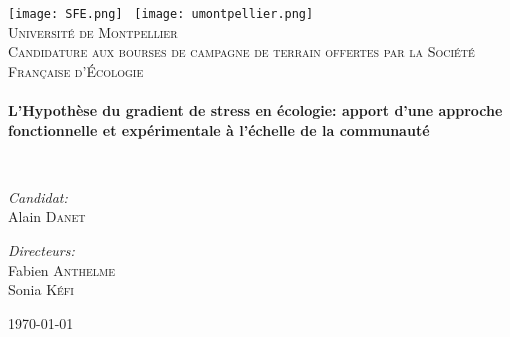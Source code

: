 \begin{titlepage}
\begin{center}

\texttt{[image: SFE.png]}~ \hfill \texttt{[image: umontpellier.png]}~\\[1cm]

\textsc{\LARGE Université de Montpellier}\\[1.5cm]

\textsc{\large Candidature aux bourses de campagne de terrain offertes par la 
Société Française d'Écologie}\\[0.5cm]

\HRule \\[0.4cm]
{ \Large \bfseries  L'Hypothèse du gradient de stress en écologie: apport d'une approche fonctionnelle et expérimentale à l'échelle de la communauté \\[0.4cm] }

\HRule \\[1.5cm]

\noindent
\begin{minipage}{0.4\textwidth}
\begin{flushleft} \large
\emph{Candidat:}\\
Alain \textsc{Danet}
\end{flushleft}
\end{minipage}%
\begin{minipage}{0.4\textwidth}
\begin{flushright} \large
\emph{Directeurs:} \\
Fabien \textsc{Anthelme} \\[0.0cm]
Sonia \textsc{Kéfi}
\end{flushright}
\end{minipage}

\vfill

{\large \today}

\end{center}
\end{titlepage}